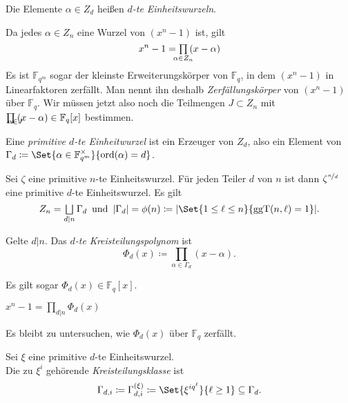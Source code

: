 \documentclass{cheat-sheet}
\newcommand{\F}{\mathbb{F}} %
\newcommand{\divides}{|} %
\DeclareMathOperator{\ggT}{ggT} %
\DeclareMathOperator{\ord}{ord} %
\begin{document}
\begin{defn}
  Die Elemente $\alpha \in Z_d$ heißen \emph{$d$-te Einheitswurzeln}.
\end{defn}

\begin{bem}
  Da jedes $\alpha \in Z_n$ eine Wurzel von $(x^n - 1)$ ist, gilt
  \[
    x^n - 1 = \prod_{\mathclap{\alpha \in Z_n}} \, (x - \alpha)
  \]
  Es ist $\F_{q^m}$ sogar der kleinste Erweiterungskörper von $\F_q$, in dem $(x^n - 1)$ in Linearfaktoren zerfällt.
  Man nennt ihn deshalb \textit{Zerfällungskörper} von $(x^n - 1)$ über $\F_q$.
  Wir müssen jetzt also noch die Teilmengen $J \subset Z_n$ mit $\prod_{\mathclap{\alpha \in J}} \, (x - \alpha) \in \F_q[x]$ bestimmen.
\end{bem}

\begin{defn}
  Eine \emph{primitive $d$-te Einheitwurzel} ist ein Erzeuger von $Z_d$, also ein Element von
  $
    \Gamma_d \coloneqq \Set{\alpha \in \F_{q^m}^{\times}}{\ord(\alpha) = d}
  $.
\end{defn}

\begin{bem}
  Sei $\zeta$ eine primitive $n$-te Einheitswurzel.
  Für jeden Teiler $d$ von $n$ ist dann $\zeta^{\nicefrac{n}{d}}$ eine primitive $d$-te Einheitswurzel.
  Es gilt
  \[
    Z_n = \bigsqcup_{d \divides n} \Gamma_d
    \enspace \text{und} \enspace
    \abs{\Gamma_d} = \phi(n) \coloneqq \abs{\Set{1 \leq \ell \leq n}{\ggT(n, \ell) = 1}}.
  \]
\end{bem}

\begin{defn}
  Gelte $d \divides n$.
  Das \emph{$d$-te Kreisteilungspolynom} ist
  \[
    \Phi_d(x) \coloneqq \prod_{\alpha \in \Gamma_d} (x - \alpha).
  \]
\end{defn}

\begin{lem}
  Es gilt sogar $\Phi_d(x) \in \F_q[x]$.
\end{lem}

\begin{kor}
  $x^n - 1 = \prod_{d \divides n} \Phi_d(x)$
\end{kor}

\begin{bem}
  Es bleibt zu untersuchen, wie $\Phi_d(x)$ über $\F_q$ zerfällt.
\end{bem}

\begin{defn}
  Sei $\xi$ eine primitive $d$-te Einheitswurzel. \\
  Die zu $\xi^i$ gehörende \emph{Kreisteilungsklasse} ist
  \[
    \Gamma_{d,i} \coloneqq \Gamma^{(\xi)}_{d,i} \coloneqq \Set{\xi^{i q^\ell}}{\ell \geq 1} \subseteq \Gamma_d.
  \]
\end{defn}
\end{document}
